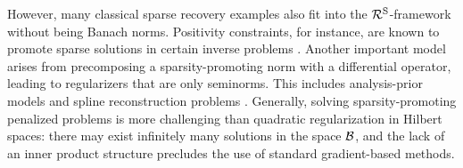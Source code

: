\documentclass[12pt]{article}
\begin{document}
    However, many classical sparse recovery examples also fit into the $\mathcal{R}^\mathrm{S}$-framework without being Banach norms. Positivity constraints, for instance, are known to promote sparse solutions in certain inverse problems \cite{Donoho_Tanner_2005,Slawski_Hein_2011}. Another important model arises from precomposing a sparsity-promoting norm with a differential operator, leading to regularizers that are only seminorms. This includes analysis-prior models \cite{elad2006analysis} and spline reconstruction problems \cite{unser2017splines}.
    Generally, solving sparsity-promoting penalized problems is more challenging than quadratic regularization in Hilbert spaces: there may exist infinitely many solutions in the space $\mathcal{B}$, and the lack of an inner product structure precludes the use of standard gradient-based methods.
\end{document}

